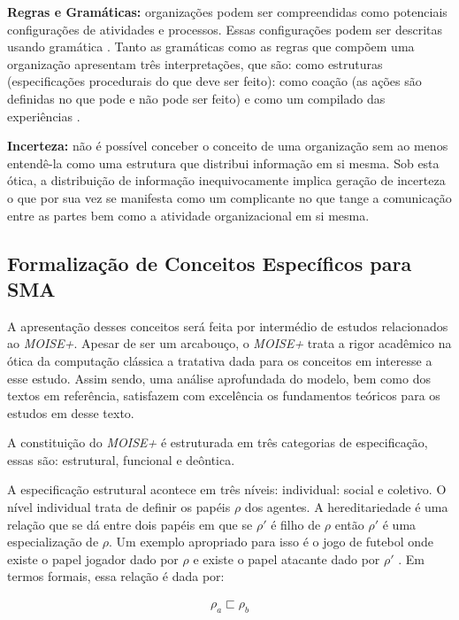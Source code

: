 \textbf{Regras e Gramáticas:} organizações podem ser compreendidas como potenciais configurações de atividades e processos. Essas configurações podem ser descritas usando gramática \cite{grammarselforganizationmodel} \cite{grammarselforganizationmodel2}. Tanto as gramáticas como as regras que compõem uma organização apresentam três interpretações, que são: como estruturas (especificações procedurais do que deve ser feito): como coação (as ações são definidas no que pode e não pode ser feito) e como um compilado das experiências \cite{organiationofmultiagentsystem}.

\textbf{Incerteza:} não é possível conceber o conceito de uma organização sem ao menos entendê-la como uma estrutura que distribui informação em si mesma. Sob esta ótica, a distribuição de informação inequivocamente implica geração de incerteza o que por sua vez se manifesta como um complicante no que tange a comunicação entre as partes bem como a atividade organizacional em si mesma.

\subsection{Formalização de Conceitos Específicos para SMA}
\label{moiseformalizesma}
A apresentação desses conceitos será feita por intermédio de estudos relacionados ao \textit{MOISE+}. Apesar de ser um arcabouço, o \textit{MOISE+} trata a rigor acadêmico na ótica da computação clássica a tratativa dada para os conceitos em interesse a esse estudo. Assim sendo, uma análise aprofundada do modelo, bem como dos textos em referência, satisfazem com excelência os fundamentos teóricos para os estudos em desse texto. 

A constituição do \textit{MOISE+} é estruturada em três categorias de especificação, essas são: estrutural, funcional e deôntica. 

A especificação estrutural acontece em três níveis: individual: social e coletivo. O nível individual trata de definir os papéis $\rho$ dos agentes. A hereditariedade é uma relação que se dá entre dois papéis em que se $\rho'$ é filho de $\rho$ então $\rho'$ é uma especialização de $\rho$. Um exemplo apropriado para isso é o jogo de futebol onde existe o papel jogador dado por $\rho$ e existe o papel atacante dado por $\rho'$ \cite{moiseframework} \cite{roleone} \cite{roletwo} \cite{dynamicagenttemporalstruct}. Em termos formais, essa relação é dada por: 

\begin{eqnarray}
\rho_a \sqsubset \rho_b
\end{eqnarray}

